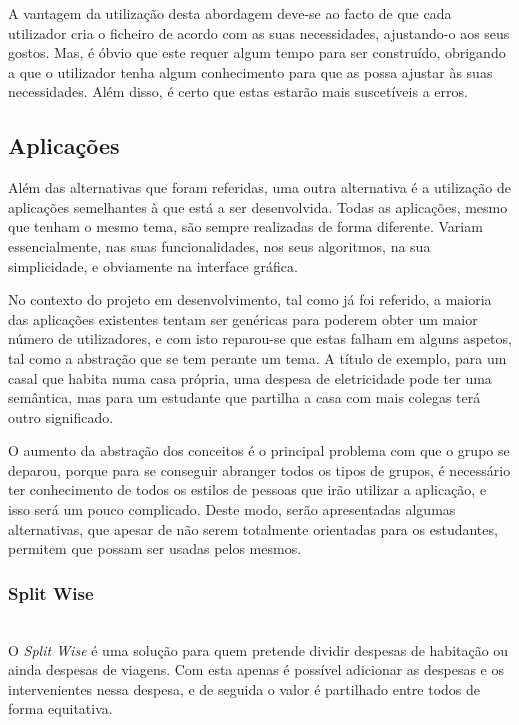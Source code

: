 A vantagem da utilização desta abordagem deve-se ao facto de que cada utilizador cria o ficheiro de acordo com as suas necessidades, ajustando-o aos seus gostos. Mas, é óbvio que este requer algum tempo para ser construído, obrigando a que o utilizador tenha algum conhecimento para que as possa ajustar às suas necessidades. Além disso, é certo que estas estarão mais suscetíveis a erros.

\subsection{Aplicações}

Além das alternativas que foram referidas, uma outra alternativa é a utilização de aplicações semelhantes à que está a ser desenvolvida. Todas as aplicações, mesmo que tenham o mesmo tema, são sempre realizadas de forma diferente. Variam essencialmente, nas suas funcionalidades, nos seus algoritmos, na sua simplicidade, e obviamente na interface gráfica.

No contexto do projeto em desenvolvimento, tal como já foi referido, a maioria das aplicações existentes tentam ser genéricas para poderem obter um maior número de utilizadores, e com isto reparou-se que estas falham em alguns aspetos, tal como a abstração que se tem perante um tema. A título de exemplo, para um casal que habita numa casa própria, uma despesa de eletricidade pode ter uma semântica, mas para um estudante que partilha a casa com mais colegas terá outro significado.

O aumento da abstração dos conceitos é o principal problema com que o grupo se deparou, porque para se conseguir abranger todos os tipos de grupos, é necessário ter conhecimento de todos os estilos de pessoas que irão utilizar a aplicação, e isso será um pouco complicado.
Deste modo, serão apresentadas algumas alternativas, que apesar de não serem totalmente orientadas para os estudantes, permitem que possam ser usadas pelos mesmos.

\subsubsection{Split Wise}
\mbox{}\\
\-\hspace{0.3cm} O \textit{Split Wise} é uma solução para quem pretende dividir despesas de habitação ou ainda despesas de viagens.
Com esta apenas é possível adicionar as despesas e os intervenientes nessa despesa, e de seguida o valor é partilhado entre todos de forma equitativa.

